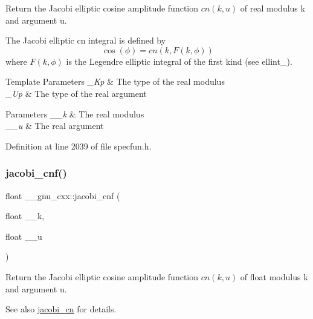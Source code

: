 Return the Jacobi elliptic cosine amplitude function $ cn(k,u) $ of real modulus {\ttfamily k} and argument {\ttfamily u}.

The Jacobi elliptic {\ttfamily cn} integral is defined by \[ \cos(\phi) = cn(k, F(k,\phi)) \] where $ F(k,\phi) $ is the Legendre elliptic integral of the first kind (see ellint\+\_).


\begin{DoxyTemplParams}{Template Parameters}
{\em \+\_\+\+Kp} & The type of the real modulus \\
\hline
{\em \+\_\+\+Up} & The type of the real argument \\
\hline
\end{DoxyTemplParams}

\begin{DoxyParams}{Parameters}
{\em \+\_\+\+\_\+k} & The real modulus \\
\hline
{\em \+\_\+\+\_\+u} & The real argument \\
\hline
\end{DoxyParams}


Definition at line 2039 of file specfun.\+h.

\mbox{\label{group__mathsf__gnu_gadbd6320123f45ae10d539cf8df0373cd}} 
\subsubsection{\texorpdfstring{jacobi\+\_\+cnf()}{jacobi\_cnf()}}
{\footnotesize\ttfamily float \+\_\+\+\_\+gnu\+\_\+cxx\+::jacobi\+\_\+cnf (\begin{DoxyParamCaption}\item[{float}]{\+\_\+\+\_\+k,  }\item[{float}]{\+\_\+\+\_\+u }\end{DoxyParamCaption})\hspace{0.3cm}{\ttfamily [inline]}}

Return the Jacobi elliptic cosine amplitude function $ cn(k,u) $ of {\ttfamily float} modulus {\ttfamily k} and argument {\ttfamily u}.

\begin{DoxySeeAlso}{See also}
\hyperlink{group__mathsf__gnu_ga2e1c43b232d378164bed1433041ca7dc}{jacobi\+\_\+cn} for details. 
\end{DoxySeeAlso}


